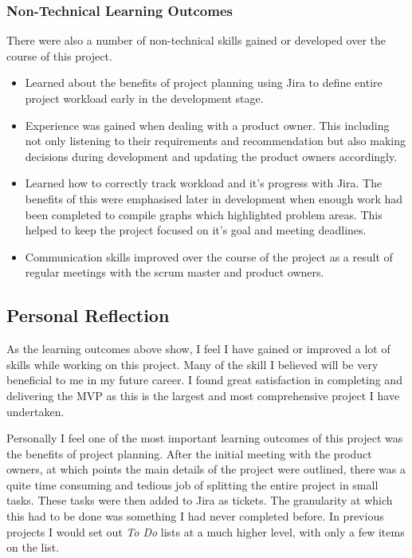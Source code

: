   \subsubsection{Non-Technical Learning Outcomes}
  There were also a number of  non-technical skills gained or developed over the course of this project.
  
  \begin{itemize}
    \item Learned about the benefits of project planning using Jira to define entire project workload early in the development stage.
    \item Experience was gained when dealing with a product owner. This including not only listening to their requirements and recommendation but also making decisions during development and updating the product owners accordingly.
    \item Learned how to correctly track workload and it's progress with Jira. The benefits of this were emphasised later in development when enough work had been completed to compile graphs which highlighted problem areas. This helped to keep the project focused on it's goal and meeting deadlines.
    \item Communication skills improved over the course of the project as a result of regular meetings with the scrum master and product owners.
  \end{itemize}
	
  \subsection{Personal Reflection}
  As the learning outcomes above show, I feel I have gained or improved a lot of skills while working on this project. Many of the skill I believed will be very beneficial to me in my future career. I found great satisfaction in completing and delivering the MVP as this is the largest and most comprehensive project I have undertaken.
  
  Personally I feel one of the most important learning outcomes of this project was the benefits of project planning. After the initial meeting with the product owners, at which points the main details of the project were outlined, there was a quite time consuming and tedious job of splitting the entire project in small tasks. These tasks were then added to Jira as tickets. The granularity at which this had to be done was something I had never completed before. In previous projects I would set out \textit{To Do} lists at a much higher level, with only a few items on the list. 
  
